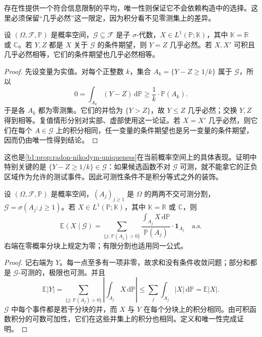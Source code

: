 存在性提供一个符合信息限制的平均，唯一性则保证它不会依赖构造中的选择。这里必须保留“几乎必然”这一限定，因为积分看不见零测集上的差异。

\begin{proposition}[条件期望的唯一性]\label{b1:prop:conditional-expectation-uniqueness-31}
设 \((\Omega,\mathcal F,\mathbb P)\) 是概率空间，\(\mathcal G\subseteq\mathcal F\) 是子 \(\sigma\)-代数，\(X\in L^1(\mathbb P;\mathbb K)\)，其中 \(\mathbb K=\mathbb R\) 或 \(\mathbb C\)。若 \(Y,Z\) 都是 \(X\) 关于 \(\mathcal G\) 的条件期望，则 \(Y=Z\) 几乎必然。若 \(X,X'\) 可积且几乎必然相等，它们的条件期望也几乎必然相等。
\end{proposition}
\begin{proof}
先设变量为实值。对每个正整数 \(k\)，集合
\(A_k=\{Y-Z\geq1/k\}\) 属于 \(\mathcal G\)，所以
\[
 0=\int_{A_k}(Y-Z)\,\mathrm d\mathbb P
 \geq\frac1k\cdot\mathbb P(A_k).
\]
于是各 \(A_k\) 都为零测集。它们的并恰为 \(\{Y>Z\}\)，故 \(Y\leq Z\) 几乎必然；交换 \(Y,Z\) 得到相等。复值情形分别对实部、虚部使用这一论证。若 \(X=X'\) 几乎必然，则它们在每个 \(A\in\mathcal G\) 上的积分相同，任一变量的条件期望也是另一变量的条件期望，因而仍由唯一性得到结论。
\end{proof}

这也是\cref{b1:prop:radon-nikodym-uniqueness}在当前概率空间上的具体表现。证明中特别关键的是 \(\{Y-Z\geq1/k\}\in\mathcal G\)：如果候选函数不对 \(\mathcal G\) 可测，就不能拿它的正负区域作为允许的测试事件。因此可测性条件不是积分等式之外的装饰。

\begin{proposition}[可数分割上的条件期望]\label{b1:prop:conditional-expectation-partition-31}
设 \((\Omega,\mathcal F,\mathbb P)\) 是概率空间，\((A_j)_{j\geq1}\) 是 \(\Omega\) 的两两不交可测分割，\(\mathcal G=\sigma(A_j:j\geq1)\)。若 \(X\in L^1(\mathbb P;\mathbb K)\)，其中 \(\mathbb K=\mathbb R\) 或 \(\mathbb C\)，则
\[
 \mathbb E(X\mid\mathcal G)
 =\sum_{\{j:\,\mathbb P(A_j)>0\}}
 \frac{\displaystyle\int_{A_j}X\,\mathrm d\mathbb P}
      {\mathbb P(A_j)}\cdot\mathbf1_{A_j}
 \quad\text{a.s.}
\]
右端在零概率分块上规定为零；有限分割也适用同一公式。
\end{proposition}
\begin{proof}
记右端为 \(Y\)。每一点至多有一项非零，故求和没有条件收敛问题；部分和都是 \(\mathcal G\)-可测的，极限也可测。并且
\[
 \mathbb E|Y|
 =\sum_{\{j:\,\mathbb P(A_j)>0\}}
   \left|\int_{A_j}X\,\mathrm d\mathbb P\right|
 \leq\sum_j\int_{A_j}|X|\,\mathrm d\mathbb P
 =\mathbb E|X|.
\]
\(\mathcal G\) 中每个事件都是若干分块的并，而 \(X\) 与 \(Y\) 在每个分块上的积分相同。由可积函数积分的可数可加性，它们在这些并集上的积分也相同。定义和唯一性完成证明。
\end{proof}


